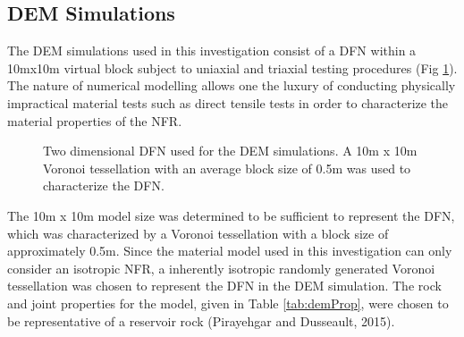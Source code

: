 \subsection{DEM Simulations}

The DEM simulations used in this investigation consist of a DFN within
a 10mx10m virtual block subject to uniaxial and triaxial testing
procedures (Fig \ref{fig:vorDFN}). The nature of numerical modelling
allows one the luxury of conducting physically impractical material
tests such as direct tensile tests in order to characterize the material
properties of the NFR.

\begin{figure}
\label{fig:vorDFN} \caption{Two dimensional DFN used for the DEM simulations. A 10m x 10m Voronoi
tessellation with an average block size of 0.5m was used to characterize
the DFN.}
\end{figure}


The 10m x 10m model size was determined to be sufficient to represent
the DFN, which was characterized by a Voronoi tessellation with a
block size of approximately 0.5m. Since the material model used in
this investigation can only consider an isotropic NFR, a inherently
isotropic randomly generated Voronoi tessellation was chosen to represent
the DFN in the DEM simulation. The rock and joint properties for the
model, given in Table \ref{tab:demProp}, were chosen to be representative
of a reservoir rock (Pirayehgar and Dusseault, 2015).

